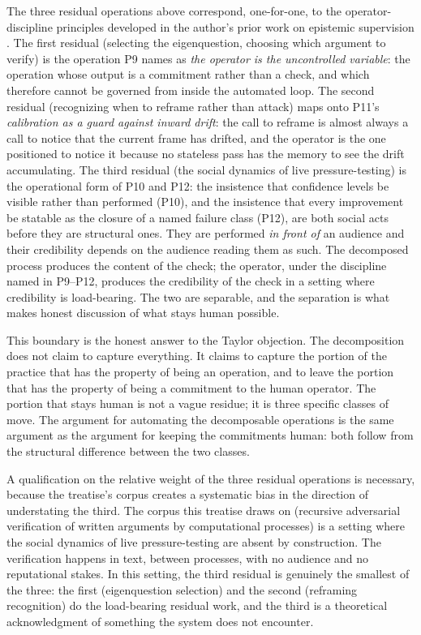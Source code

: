 \documentclass[11pt]{article}
\begin{document}
The three residual operations above correspond, one-for-one, to the operator-discipline principles developed in the author's prior work on epistemic supervision \citep{alami2026c}. The first residual (selecting the eigenquestion, choosing which argument to verify) is the operation P9 names as \emph{the operator is the uncontrolled variable}: the operation whose output is a commitment rather than a check, and which therefore cannot be governed from inside the automated loop. The second residual (recognizing when to reframe rather than attack) maps onto P11's \emph{calibration as a guard against inward drift}: the call to reframe is almost always a call to notice that the current frame has drifted, and the operator is the one positioned to notice it because no stateless pass has the memory to see the drift accumulating. The third residual (the social dynamics of live pressure-testing) is the operational form of P10 and P12: the insistence that confidence levels be visible rather than performed (P10), and the insistence that every improvement be statable as the closure of a named failure class (P12), are both social acts before they are structural ones. They are performed \emph{in front of} an audience and their credibility depends on the audience reading them as such. The decomposed process produces the content of the check; the operator, under the discipline named in P9--P12, produces the credibility of the check in a setting where credibility is load-bearing. The two are separable, and the separation is what makes honest discussion of what stays human possible.

This boundary is the honest answer to the Taylor objection. The decomposition does not claim to capture everything. It claims to capture the portion of the practice that has the property of being an operation, and to leave the portion that has the property of being a commitment to the human operator. The portion that stays human is not a vague residue; it is three specific classes of move. The argument for automating the decomposable operations is the same argument as the argument for keeping the commitments human: both follow from the structural difference between the two classes.

A qualification on the relative weight of the three residual operations is necessary, because the treatise's corpus creates a systematic bias in the direction of understating the third. The corpus this treatise draws on (recursive adversarial verification of written arguments by computational processes) is a setting where the social dynamics of live pressure-testing are absent by construction. The verification happens in text, between processes, with no audience and no reputational stakes. In this setting, the third residual is genuinely the smallest of the three: the first (eigenquestion selection) and the second (reframing recognition) do the load-bearing residual work, and the third is a theoretical acknowledgment of something the system does not encounter.
\end{document}
